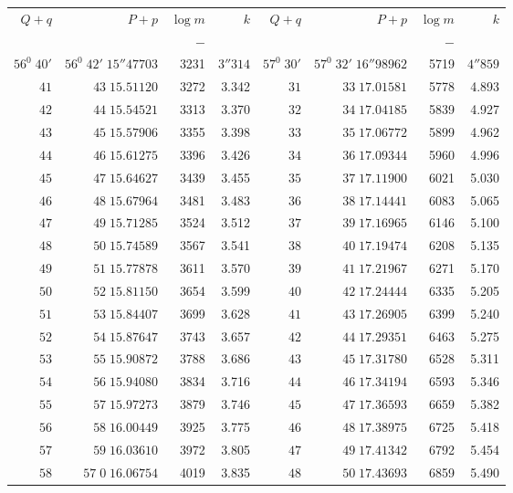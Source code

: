 \clearpage
{}
\begingroup
\fontsize{8}{9}\selectfont
\setlength{\tabcolsep}{3pt}
\renewcommand{\arraystretch}{1.08}
\begin{center}
\begin{tabular}{|r|r|r|r||r|r|r|r|}
\hline
\(Q+q\)&\(P+p\)&\(\log m\)&\(k\)&\(Q+q\)&\(P+p\)&\(\log m\)&\(k\)\\
&&\(-\)&&&&\(-\)&\\\hline
\(56^0\;40'\)&\(56^0\;42'\;15''47703\)&3231&\(3''314\)&\(57^0\;30'\)&\(57^0\;32'\;16''98962\)&5719&\(4''859\)\\
\(41\)&\(43\;15.51120\)&3272&3.342&\(31\)&\(33\;17.01581\)&5778&4.893\\
\(42\)&\(44\;15.54521\)&3313&3.370&\(32\)&\(34\;17.04185\)&5839&4.927\\
\(43\)&\(45\;15.57906\)&3355&3.398&\(33\)&\(35\;17.06772\)&5899&4.962\\
\(44\)&\(46\;15.61275\)&3396&3.426&\(34\)&\(36\;17.09344\)&5960&4.996\\
\(45\)&\(47\;15.64627\)&3439&3.455&\(35\)&\(37\;17.11900\)&6021&5.030\\
\(46\)&\(48\;15.67964\)&3481&3.483&\(36\)&\(38\;17.14441\)&6083&5.065\\
\(47\)&\(49\;15.71285\)&3524&3.512&\(37\)&\(39\;17.16965\)&6146&5.100\\
\(48\)&\(50\;15.74589\)&3567&3.541&\(38\)&\(40\;17.19474\)&6208&5.135\\
\(49\)&\(51\;15.77878\)&3611&3.570&\(39\)&\(41\;17.21967\)&6271&5.170\\[3pt]
\(50\)&\(52\;15.81150\)&3654&3.599&\(40\)&\(42\;17.24444\)&6335&5.205\\
\(51\)&\(53\;15.84407\)&3699&3.628&\(41\)&\(43\;17.26905\)&6399&5.240\\
\(52\)&\(54\;15.87647\)&3743&3.657&\(42\)&\(44\;17.29351\)&6463&5.275\\
\(53\)&\(55\;15.90872\)&3788&3.686&\(43\)&\(45\;17.31780\)&6528&5.311\\
\(54\)&\(56\;15.94080\)&3834&3.716&\(44\)&\(46\;17.34194\)&6593&5.346\\
\(55\)&\(57\;15.97273\)&3879&3.746&\(45\)&\(47\;17.36593\)&6659&5.382\\
\(56\)&\(58\;16.00449\)&3925&3.775&\(46\)&\(48\;17.38975\)&6725&5.418\\
\(57\)&\(59\;16.03610\)&3972&3.805&\(47\)&\(49\;17.41342\)&6792&5.454\\
\(58\)&\(57\;0\;16.06754\)&4019&3.835&\(48\)&\(50\;17.43693\)&6859&5.490\\

\end{tabular}
\end{center}

